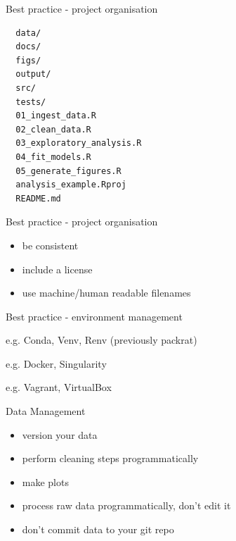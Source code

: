 \documentclass{beamer} %
\begin{document}
  \begin{frame}[fragile]{Best practice - project organisation}
        \small
        \begin{verbatim}
  data/
  docs/
  figs/
  output/
  src/
  tests/
  01_ingest_data.R
  02_clean_data.R
  03_exploratory_analysis.R
  04_fit_models.R
  05_generate_figures.R
  analysis_example.Rproj
  README.md\end{verbatim}
  \end{frame}

  \begin{frame}{Best practice - project organisation}
    \begin{itemize}
      \item be consistent
      \item include a license
      \item use machine/human readable filenames
    \end{itemize}
  \end{frame}


  \begin{frame}{Best practice - environment management}
    \begin{tcolorbox}[skin=beamer,adjusted title=Virtual environments]
      e.g. Conda, Venv, Renv (previously packrat)
    \end{tcolorbox}
    \begin{tcolorbox}[skin=beamer,adjusted title=Containers]
      e.g. Docker, Singularity
    \end{tcolorbox}
    \begin{tcolorbox}[skin=beamer,adjusted title=Virtual Machines]
      e.g. Vagrant,  VirtualBox
    \end{tcolorbox}    
  \end{frame}

  \begin{frame}[label=DATA]{Data Management}
    \begin{itemize}
      \item version your data
      \item perform cleaning steps programmatically
      \item make plots
      \item process raw data programmatically, don't edit it
      \item don't commit data to your git repo
    \end{itemize}
  \end{frame}
\end{document}
